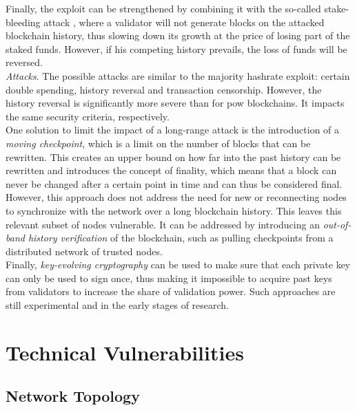 \documentclass[12pt,a4paper]{article}
\begin{document}
Finally, the exploit can be strengthened by combining it with the so-called stake-bleeding attack \cite{bleeding}, where a \gls{validator} will not generate \glspl{block} on the attacked blockchain history, thus slowing down its growth at the price of losing part of the staked funds. However, if his competing history prevails, the loss of funds will be reversed.\\

\textit{Attacks}. The possible attacks are similar to the majority hashrate exploit: certain double spending, history reversal and transaction censorship. However, the history reversal is significantly more severe than for \acrshort{pow} \glspl{blockchain}. It impacts the same security criteria, respectively.\\

One solution to limit the impact of a long-range attack is the introduction of a \textit{moving checkpoint}, which is a limit on the number of blocks that can be rewritten. This creates an upper bound on how far into the past history can be rewritten and introduces the concept of finality, which means that a block can never be changed after a certain point in time and can thus be considered final.\\

However, this approach does not address the need for new or reconnecting nodes to synchronize with the network over a long blockchain history. This leaves this relevant subset of nodes vulnerable. It can be addressed by introducing an \textit{out-of-band history verification} of the blockchain, such as pulling checkpoints from a distributed network of trusted nodes.\\

Finally, \textit{key-evolving cryptography} can be used to make sure that each private key can only be used to sign once, thus making it impossible to acquire past keys from validators to increase the share of validation power. Such approaches are still experimental and in the early stages of research.\\

\section{Technical Vulnerabilities}

\subsection{Network Topology}
\end{document}
